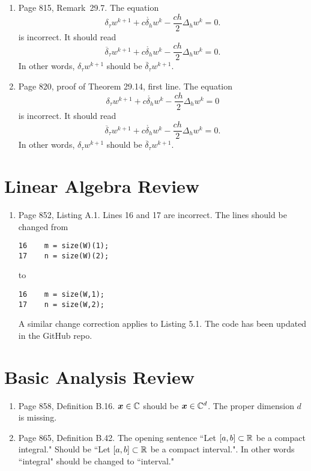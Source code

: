 \documentclass{book}
\begin{document}
\begin{enumerate}
	\item
Page 815, Remark~29.7. The equation
\[
  \delta_\tau w^{k+1} + c \mathring{\delta_h} w^k - \frac{ch}2 \Delta_h w^k  =0.
\]
is incorrect. It should read
\[
\overline\delta_\tau w^{k+1} + c \mathring{\delta_h} w^k - \frac{ch}2 \Delta_h w^k  =0.
\]
In other words, $\delta_\tau w^{k+1}$ should be $\overline\delta_\tau w^{k+1}$.
	
	
	\item
Page 820, proof of Theorem 29.14, first line. The equation 
\[
  \delta_\tau w^{k+1} + c \mathring{\delta_h} w^k - \frac{ch}2 \Delta_h w^k  =0
\]
is incorrect. It should read 
\[
\overline \delta_\tau w^{k+1} + c \mathring{\delta_h} w^k - \frac{ch}2 \Delta_h w^k  =0.
\]
In other words, $\delta_\tau w^{k+1}$ should be $\overline\delta_\tau w^{k+1}$.
	
	\end{enumerate}
	
	\appendix
	
\chapter{Linear Algebra Review}

	\begin{enumerate}
	\item
Page 852, Listing A.1. Lines 16 and 17 are incorrect. The lines should be changed from
	\begin{verbatim}
16    m = size(W)(1);
17    n = size(W)(2);	
	\end{verbatim}
to 
	\begin{verbatim}
16    m = size(W,1);
17    n = size(W,2);	
	\end{verbatim}
A similar change correction applies to Listing 5.1. The code has been updated in the GitHub repo.
 
	\end{enumerate}
	
\chapter{Basic Analysis Review}

	\begin{enumerate}
	\item
Page 858, Definition B.16. $\boldsymbol{x}\in\mathbb C$ should be  $\boldsymbol{x}\in\mathbb C^d$. The proper dimension $d$ is missing.

	\item
Page 865, Definition B.42. The opening sentence ``Let $[a,b]\subset \mathbb R$ be a compact integral." Should be ``Let $[a,b]\subset \mathbb R$ be a compact interval.". In other words ``integral" should be changed to ``interval." 
	\end{enumerate}

	
\end{document}
